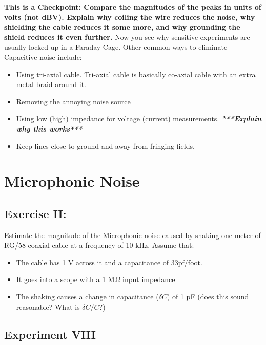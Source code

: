 \documentclass{../lab}
\begin{document}
\textbf{This is a Checkpoint: Compare the magnitudes of the peaks in units of volts (not dBV). Explain why coiling the wire reduces the noise, why shielding the cable reduces it some more, and why grounding the shield reduces it even further.}
Now you see why sensitive experiments are usually locked up in a Faraday Cage. Other common ways to eliminate Capacitive noise include:

\begin{itemize}
    \item Using tri-axial cable. Tri-axial cable is basically co-axial cable with an extra metal braid around it.

    \item Removing the annoying noise source

    \item Using low (high) impedance for voltage (current) measurements. \emph{\textbf{***Explain why this works***}}

    \item Keep lines close to ground and away from fringing fields.

\end{itemize}

\section{Microphonic Noise}

\subsection{Exercise II:}

Estimate the magnitude of the Microphonic noise caused by shaking one meter of RG/58 coaxial cable at a frequency of 10 kHz. Assume that:

\begin{itemize}
    \item The cable has 1 V across it and a capacitance of 33pf/foot.

    \item It goes into a scope with a 1 M$\Omega$ input impedance

    \item The shaking causes a change in capacitance ($\delta C$) of 1 pF (does this sound reasonable? What is $\delta C/C$?)

\end{itemize}

\subsection{Experiment VIII}
\end{document}
